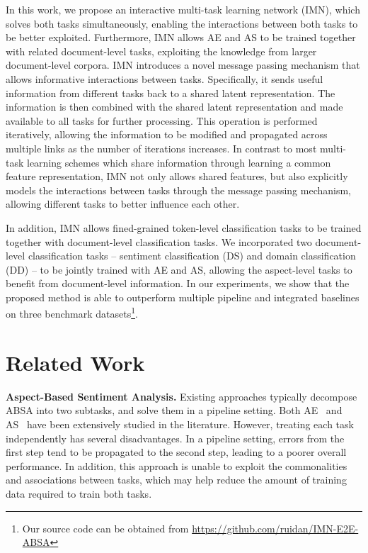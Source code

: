 \documentclass[11pt,a4paper]{article}
\begin{document}
In this work, we propose an interactive multi-task learning network (IMN), which solves both tasks simultaneously, enabling the interactions between both tasks to be better exploited. 
Furthermore, IMN allows AE and AS to be trained together with related document-level tasks, exploiting the knowledge from larger document-level corpora. 
IMN introduces a novel message passing mechanism that allows informative interactions between tasks.  Specifically, it sends useful information from different tasks back to a shared latent representation. The information is then combined with the shared latent representation and made available to all tasks for further processing. This operation is performed iteratively, allowing the information to be modified and propagated across multiple links as the number of iterations increases. 
In contrast to most multi-task learning schemes which share information through learning a common feature representation, IMN not only allows shared features, but also explicitly models the interactions between tasks through the message passing mechanism, allowing different tasks to better influence each other. 

In addition, IMN allows fined-grained token-level classification tasks to be trained together with document-level classification tasks. We incorporated two document-level classification tasks -- sentiment classification (DS) and domain classification (DD) --  to be jointly trained with AE and AS, allowing the aspect-level tasks to benefit from document-level information. 
In our experiments, we show that the proposed method is able to outperform multiple pipeline and integrated baselines on three benchmark datasets\footnote{Our source code can be obtained from \url{https://github.com/ruidan/IMN-E2E-ABSA}}.



\section{Related Work}\label{related work}

\noindent \textbf{Aspect-Based Sentiment Analysis.}
Existing approaches typically decompose ABSA into two subtasks, and solve them in a pipeline setting. Both AE~\citep{Qiu:11, Yin:16, Wang:16b, Wang:17, Li:17, He:17, Li:18b, stefanos18} and AS~\citep{Dong:14, Nguyen:15, Vo:15, Tang:16a, Wang:16, zhang:16, Liu:17, Chen:17, Cheng:17, Tay:18, Ma:18, He:18b, He:18, Li:18a} have been extensively studied in the literature. However, treating each task independently has several disadvantages. In a pipeline setting, errors from the first step tend to be propagated to the second step, leading to a poorer overall performance. In addition, this approach is unable to exploit the commonalities and associations between tasks, which may help reduce the amount of training data required to train both tasks.
\end{document}
